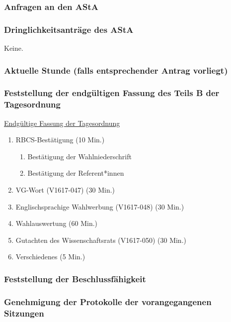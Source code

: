 \documentclass[ngerman,headheight=70pt]{scrartcl}
\begin{document}
    \subsubsection{Anfragen an den AStA}



    \subsubsection{Dringlichkeitsanträge des AStA}

    Keine.

    \subsubsection{Aktuelle Stunde (falls entsprechender Antrag vorliegt)}


    \subsubsection{Feststellung der endgültigen Fassung des Teils B der Tagesordnung}

    \newpage
    \underline{Endgültige Fassung der Tagesordnung}
    \begin{enumerate}[label={\textbf{Top \theenumi}},leftmargin=*]
        \item RBCS-Bestätigung (10 Min.)
        \begin{enumerate}
            \item Bestätigung der Wahlniederschrift
            \item Bestätigung der Referent*innen
        \end{enumerate}
        \item VG-Wort (V1617-047) (30 Min.)
        \item Englischsprachige Wahlwerbung (V1617-048) (30 Min.)
        \item Wahlauswertung (60 Min.)
        \item Gutachten des Wissenschaftsrats (V1617-050) (30 Min.)
        \item Verschiedenes (5 Min.)
    \end{enumerate}


    \subsubsection{Feststellung der Beschlussfähigkeit}

    \subsubsection{Genehmigung der Protokolle der vorangegangenen Sitzungen}
\end{document}
